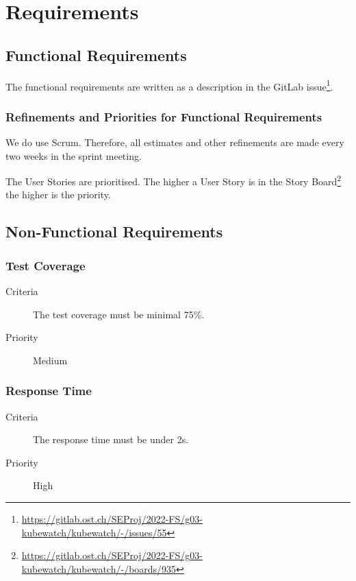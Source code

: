 \chapter{Requirements}



\section{Functional Requirements}
The functional requirements are written as a description in the GitLab issue\footnote{\url{https://gitlab.ost.ch/SEProj/2022-FS/g03-kubewatch/kubewatch/-/issues/55}}.

\subsection{Refinements and Priorities for Functional Requirements}
We do use Scrum.
Therefore, all estimates and other refinements are made every two weeks in the sprint meeting.

The User Stories are prioritised.
The higher a User Story is in the Story Board\footnote{\url{https://gitlab.ost.ch/SEProj/2022-FS/g03-kubewatch/kubewatch/-/boards/935}} the higher is the priority.



\section {Non-Functional Requirements}
\subsection{Test Coverage}
\begin{description}
\item[Criteria] The test coverage must be minimal 75\%.
\item[Priority] Medium
\end{description}

\subsection{Response Time}
\begin{description}
\item[Criteria] The response time must be under 2s.
\item[Priority] High
\end{description}


